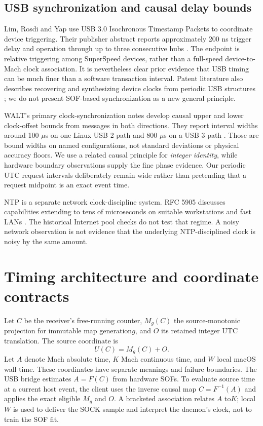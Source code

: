 \documentclass[11pt,letterpaper]{article}
\begin{document}
\subsection{USB synchronization and causal delay bounds}
Lim, Rosdi and Yap use USB 3.0 Isochronous Timestamp Packets to coordinate device triggering. Their publisher abstract reports approximately 200 ns trigger delay and operation through up to three consecutive hubs \cite{lim}. The endpoint is relative triggering among SuperSpeed devices, rather than a full-speed device-to-Mach clock association. It is nevertheless clear prior evidence that USB timing can be much finer than a software transaction interval. Patent literature also describes recovering and synthesizing device clocks from periodic USB structures \cite{usbpatent}; we do not present SOF-based synchronization as a new general principle.

WALT's primary clock-synchronization notes develop causal upper and lower clock-offset bounds from messages in both directions. They report interval widths around 100 $\mu$s on one Linux USB 2 path and 800 $\mu$s on a USB 3 path \cite{walt}. Those are bound widths on named configurations, not standard deviations or physical accuracy floors. We use a related causal principle for \emph{integer identity}, while hardware boundary observations supply the fine phase evidence. Our periodic UTC request intervals deliberately remain wide rather than pretending that a request midpoint is an exact event time.

NTP is a separate network clock-discipline system. RFC 5905 discusses capabilities extending to tens of microseconds on suitable workstations and fast LANs \cite{ntp}. The historical Internet pool checks do not test that regime. A noisy network observation is not evidence that the underlying NTP-disciplined clock is noisy by the same amount.


\section{Timing architecture and coordinate contracts}
Let $C$ be the receiver's free-running counter, $M_g(C)$ the source-monotonic projection for immutable map generation$g$, and $O$ its retained integer UTC translation. The source coordinate is
\begin{equation}U(C)=M_g(C)+O.\end{equation}
Let $A$ denote Mach absolute time, $K$ Mach continuous time, and $W$ local macOS wall time. These coordinates have separate meanings and failure boundaries. The USB bridge estimates $A=F(C)$ from hardware SOFs. To evaluate source time at a current host event, the client uses the inverse causal map $C=F^{-1}(A)$ and applies the exact eligible $M_g$ and $O$. A bracketed association relates $A$ to$K$; local $W$ is used to deliver the SOCK sample and interpret the daemon's clock, not to train the SOF fit.
\end{document}
